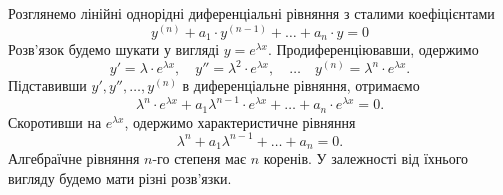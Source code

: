 Розглянемо лінійні однорідні диференціальні рівняння з сталими коефіцієнтами
\begin{equation*}
	y^{(n)} + a_1 \cdot y^{(n - 1)} + \ldots + a_n \cdot y = 0
\end{equation*}
Розв’язок будемо шукати у вигляді $y = e^{\lambda x}$. Продиференціювавши, одержимо 
\begin{equation*}
 	y' = \lambda \cdot e^{\lambda x}, \quad y'' = \lambda^2 \cdot e^{\lambda x}, \quad \ldots \quad y^{(n)} = \lambda^n \cdot e^{\lambda x}.
\end{equation*}
Підставивши $y', y'', \ldots, y^{(n)}$ в диференціальне рівняння, отримаємо
\begin{equation*}
	\lambda^n \cdot e^{\lambda x} + a_1 \lambda^{n - 1}\cdot e^{\lambda x} + \ldots + a_n \cdot e^{\lambda x} = 0.
\end{equation*}
Скоротивши на $e^{\lambda x}$, одержимо характеристичне рівняння
\begin{equation*}
	\lambda^n + a_1 \lambda^{n - 1} + \ldots + a_n = 0.
\end{equation*}
Алгебраїчне рівняння $n$-го степеня має $n$ коренів. У залежності від їхнього вигляду будемо мати різні розв’язки.
